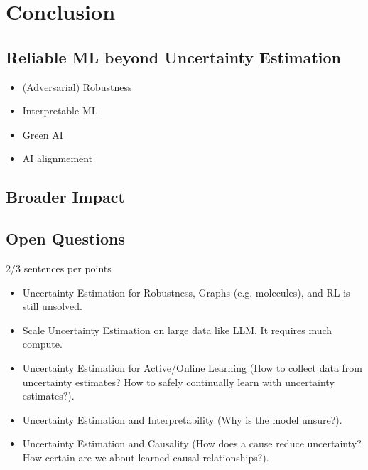 \chapter{Conclusion}
\label{chap:conclusion}

\section{Reliable ML beyond Uncertainty Estimation}

\begin{itemize}
\item (Adversarial) Robustness
\item Interpretable ML
\item Green AI
\item AI alignmement
\end{itemize}

\section{Broader Impact}

\section{Open Questions}

2/3 sentences per points

\begin{itemize}
\item Uncertainty Estimation for Robustness, Graphs (e.g. molecules), and RL is still unsolved.
\item Scale Uncertainty Estimation on large data like LLM. It requires much compute.
\item Uncertainty Estimation for Active/Online Learning (How to collect data from uncertainty estimates? How to safely continually learn with uncertainty estimates?).
\item Uncertainty Estimation and Interpretability (Why is the model unsure?).
\item Uncertainty Estimation and Causality (How does a cause reduce uncertainty? How certain are we about learned causal relationships?).
\end{itemize}